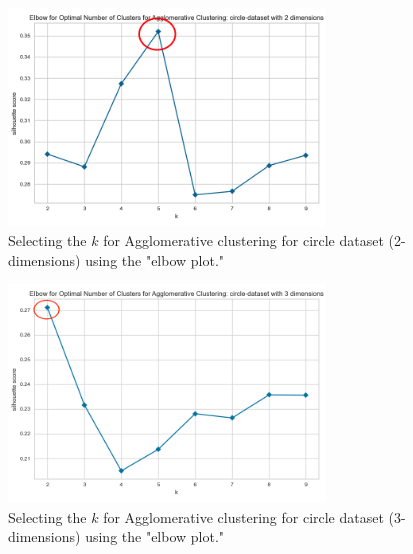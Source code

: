 \begin{figure}[H]
  \includegraphics[width=0.75\textwidth]{circle-dataset-2-agglomerative.png}
  \caption{Selecting the $k$ for Agglomerative clustering for circle dataset (2-dimensions) using the "elbow plot."}
  \label{hyperparameters:agglomerative-circle-dataset-2d}
\end{figure}
\begin{figure}[H]
  \includegraphics[width=0.75\textwidth]{circle-dataset-3-agglomerative.png}
  \caption{Selecting the $k$ for Agglomerative clustering for circle dataset (3-dimensions) using the "elbow plot."}
  \label{hyperparameters:agglomerative-circle-dataset-3d}
\end{figure}
\newpage

